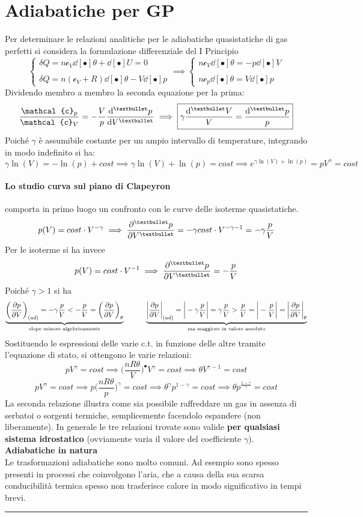 \documentclass[10pt, oneside]{book}
\newcommand{\infobox}[2]{\vspace{0.5cm}~\\ \textbf{#1} \hrulefill \vspace{0.2cm}\\#2 {}\,\\\hrule \vspace{0.5cm}}
\newcommand{\molhtv}{\mathcal{c}_V }
\newcommand{\molhtp}{\mathcal{c}_p }
\begin{document}
\section{Adiabatiche per GP}
Per determinare le relazioni analitiche per le adiabatiche quasistatiche di gas perfetti si considera la formulazione differenziale del I Principio
\[ \begin{cases} \displaystyle  \delta Q = n \molhtv \dd[•]{\theta} + \dd[•]{U} = 0 \\ \\ \displaystyle \delta Q = n (\molhtv + R) \dd[•]{\theta} - V \dd[•]{p}
\end{cases} \implies \begin{cases} \displaystyle n \molhtv \dd[•]{\theta} = -p \dd[•]{V} \\ \\ \displaystyle n \molhtp \dd[•]{\theta} = V \dd[•]{p}
\end{cases} \]
Dividendo membro a membro la seconda equazione per la prima: 
\[\frac{\molhtp}{\molhtv} = - \frac{V}{p} \dv[•]{p}{V} \implies \boxed{\gamma \frac{\dd[•]{V}}{V} = \frac{\dd[•]{p}}{p}}\]
Poiché $\gamma$ è assumibile costante per un ampio intervallo di temperature, integrando in modo indefinito si ha:
\[\gamma \ln(V) = -\ln(p) + cost \implies \gamma \ln(V) + \ln(p) = cost \implies e^{\gamma \ln(V) + \ln(p)} = pV^\gamma = cost\]
\paragraph{Lo studio curva sul piano di Clapeyron} comporta in primo luogo un confronto con le curve delle isoterme quasistatiche.
\[p(V) = cost \cdot V^{-\gamma} \implies \pdv[•]{p}{V} = - \gamma cost \cdot V^{- \gamma -1} = - \gamma \frac{p}{V}\]
Per le isoterme si ha invece
\[p(V) = cost \cdot V^{-1} \implies \pdv[•]{p}{V} = - \frac{p}{V}\]
Poiché $\gamma > 1$ si ha
\[\underbrace{\bigg(\pdv{p}{V}\bigg)_{(ad)} = - \gamma \frac{p}{V} < - \frac{p}{V} = \bigg(\pdv{p}{V}\bigg)_\theta}_{\textrm{slope minore algebricamente}} \quad \quad \quad \underbrace{\bigg|\pdv{p}{V}\bigg|_{(ad)} = \bigg|- \gamma \frac{p}{V}\bigg| = \gamma \frac{p}{V} > \frac{p}{V} = \bigg|- \frac{p}{V}\bigg| = \bigg| \pdv{p}{V}\bigg|_\theta}_{\textrm{ma maggiore in valore assoluto}}\]
Sostituendo le espressioni delle varie c.t. in funzione delle altre tramite l'equazione di stato, si ottengono le varie relazioni:
\[p V^\gamma = cost \implies \bigg(\frac{nR\theta}{V}\bigg)^{•}V^\gamma = cost \implies \boxed{\theta V^{\gamma -1} = cost}\]
\[pV^\gamma = cost \implies p \bigg(\frac{nR\theta}{p}\bigg)^{\gamma} = cost \implies \theta^\gamma p^{1-\gamma} = cost \implies \boxed{\theta p^{\frac{1-\gamma}{\gamma}} = cost}\]
La seconda relazione illustra come sia possibile raffreddare un gas in assenza di serbatoi o sorgenti termiche, semplicemente facendolo espandere (non liberamente). In generale le tre relazioni trovate sono valide \textbf{per qualsiasi sistema idrostatico} (ovviamente varia il valore del coefficiente $\gamma$).
\infobox{Adiabatiche in natura}{Le trasformazioni adiabatiche sono molto comuni. Ad esempio sono spesso presenti in processi che coinvolgono l'aria, che a causa della sua scarsa conducibilità termica spesso non trasferisce calore in modo significativo in tempi brevi.}
\end{document}
